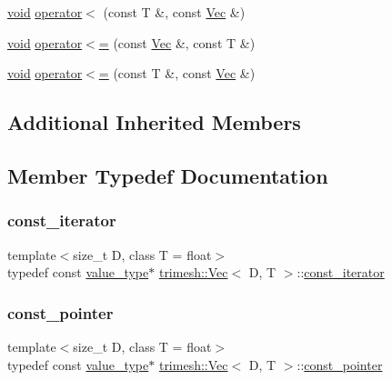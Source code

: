 \begin{DoxyCompactItemize}
\item 
\hyperlink{namespacetrimesh_a784ddfd979e1c579bda795a8edfc3f43}{void} \hyperlink{classtrimesh_1_1Vec_affdb466b5a6cde5aeb0578429c2a87af}{operator$<$} (const T \&, const \hyperlink{classtrimesh_1_1Vec}{Vec} \&)
\item 
\hyperlink{namespacetrimesh_a784ddfd979e1c579bda795a8edfc3f43}{void} \hyperlink{classtrimesh_1_1Vec_abd5f9708a2a26b804e9c55bc0ec00f8d}{operator$<$=} (const \hyperlink{classtrimesh_1_1Vec}{Vec} \&, const T \&)
\item 
\hyperlink{namespacetrimesh_a784ddfd979e1c579bda795a8edfc3f43}{void} \hyperlink{classtrimesh_1_1Vec_aa4d2343db642537fcd355c436f7e2d82}{operator$<$=} (const T \&, const \hyperlink{classtrimesh_1_1Vec}{Vec} \&)
\end{DoxyCompactItemize}
\subsection*{Additional Inherited Members}


\subsection{Member Typedef Documentation}
\mbox{\label{classtrimesh_1_1Vec_a3bd4f0e8856d283ef56a63a106881bb9}} 
\subsubsection{\texorpdfstring{const\+\_\+iterator}{const\_iterator}}
{\footnotesize\ttfamily template$<$size\+\_\+t D, class T = float$>$ \\
typedef const \hyperlink{classtrimesh_1_1Vec_a10a59253996e42d67c713f37592669df}{value\+\_\+type}$\ast$ \hyperlink{classtrimesh_1_1Vec}{trimesh\+::\+Vec}$<$ D, T $>$\+::\hyperlink{classtrimesh_1_1Vec_a3bd4f0e8856d283ef56a63a106881bb9}{const\+\_\+iterator}}

\mbox{\label{classtrimesh_1_1Vec_ac1f9825bde0a5afde5c55e9e1052bcfd}} 
\subsubsection{\texorpdfstring{const\+\_\+pointer}{const\_pointer}}
{\footnotesize\ttfamily template$<$size\+\_\+t D, class T = float$>$ \\
typedef const \hyperlink{classtrimesh_1_1Vec_a10a59253996e42d67c713f37592669df}{value\+\_\+type}$\ast$ \hyperlink{classtrimesh_1_1Vec}{trimesh\+::\+Vec}$<$ D, T $>$\+::\hyperlink{classtrimesh_1_1Vec_ac1f9825bde0a5afde5c55e9e1052bcfd}{const\+\_\+pointer}}

